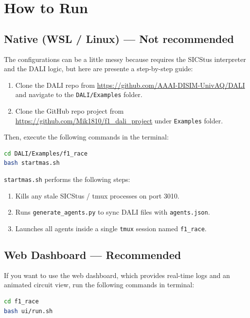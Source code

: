 \section{How to Run}

\subsection{Native (WSL / Linux) --- Not recommended}
The configurations can be a little messy because requires the SICStus interpreter and the DALI logic, but here are presente a step-by-step guide:
\begin{enumerate}
  \item Clone the DALI repo from \url{https://github.com/AAAI-DISIM-UnivAQ/DALI} and navigate to the \texttt{DALI/Examples} folder.
  \item Clone the GitHub repo project from \url{https://github.com/Mik1810/f1_dali_project} under \texttt{Examples} folder.
\end{enumerate}
Then, execute the following commands in the terminal:\\

\begin{lstlisting}[language=bash, numbers=none]
cd DALI/Examples/f1_race
bash startmas.sh
\end{lstlisting}

\texttt{startmas.sh} performs the following steps:
\begin{enumerate}[leftmargin=2em]
  \item Kills any stale SICStus / tmux processes on port 3010.
  \item Runs \texttt{generate\_agents.py} to sync DALI files with \texttt{agents.json}.
  \item Launches all agents inside a single \texttt{tmux}
        session named \texttt{f1\_race}.
\end{enumerate}

\subsection{Web Dashboard --- Recommended}

If you want to use the web dashboard, which provides real-time 
logs and an animated circuit view, run the following commands
 in terminal:\\

\begin{lstlisting}[language=bash, numbers=none]
cd f1_race
bash ui/run.sh
\end{lstlisting}

